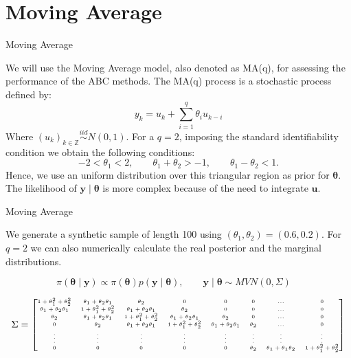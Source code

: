 \documentclass[10pt]{beamer}
\begin{document}
\section[Moving Average]{Moving Average}
\begin{frame}[fragile]{Moving Average}

  We will use the Moving Average model, also denoted as MA(q),
  for assessing the performance of the ABC methods. The MA(q) process
  is a stochastic process defined by:
  $$y_k = u_k + \sum_{i=1}^q \theta_i u_{k-i}$$
  Where $(u_k)_{k \in \mathbb Z} \overset{iid}{\sim} N(0,1)$.
  For a $q=2$, imposing the standard identifiability condition
  we obtain the following conditions:
  $$
  -2 < \theta_1 < 2, \quad \quad \theta_1+\theta_2 > -1, \quad \quad
  \theta_1 - \theta_2 < 1.
  $$
  Hence, we use an uniform distribution over this triangular region as
  prior for $\bm \theta$. The likelihood of $\bm y \mid \bm \theta$ is
  more complex because of the need to integrate $\bm u$.

\end{frame}

\begin{frame}[fragile]{Moving Average}
  
  We generate a synthetic sample of length 100 using
  $(\theta_1, \theta_2) = (0.6, 0.2)$. For $q=2$ we can also
  numerically calculate the real posterior and the marginal distributions.

  $$
  \pi(\bm\theta \mid \bm y) \propto \pi(\bm\theta)
  p(\bm y \mid \bm \theta), \quad \quad
  \bm y \mid \bm \theta \sim MVN(0, \Sigma) \quad
  $$

  $$
  \Sigma =
  \tiny{
  \begin{bmatrix}
   1+\theta_1^2 + \theta_2^2    & \theta_1 + \theta_2 \theta_1 & \theta_2                     & 0                            & 0        & 0 & ... & 0 \\
   \theta_1 + \theta_2 \theta_1 & 1+\theta_1^2 + \theta_2^2    & \theta_1 + \theta_2 \theta_1 & \theta_2                     & 0        & 0 & ... & 0 \\
   \theta_2                     & \theta_1 + \theta_2 \theta_1 & 1+\theta_1^2 + \theta_2^2    & \theta_1 + \theta_2 \theta_1 & \theta_2 & 0 & ... & 0 \\
   0               & \theta_2   & \theta_1 + \theta_2 \theta_1 & 1+\theta_1^2 + \theta_2^2    & \theta_1 + \theta_2 \theta_1 & \theta_2 &... & 0 \\
   \vdots & \vdots & \vdots & \vdots & \vdots & \vdots & \vdots & \vdots \\
   0 & 0 & 0 & 0 & 0 & \theta_2 & \theta_1 + \theta_1\theta_2 & 1+\theta_1^2 + \theta_2^2 \\
  \end{bmatrix}}
  $$

\end{frame}
\end{document}
